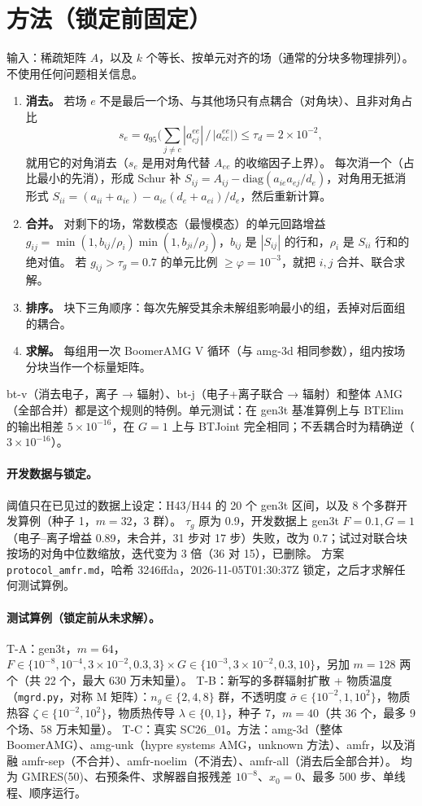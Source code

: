 \documentclass[11pt,a4paper]{ctexart}
\begin{document}
\section{方法（锁定前固定）}
输入：稀疏矩阵 $A$，以及 $k$ 个等长、按单元对齐的场（通常的分块多物理排列）。不使用任何问题相关信息。
\begin{enumerate}
\item \textbf{消去。} 若场 $e$ 不是最后一个场、与其他场只有点耦合（对角块）、且非对角占比
\[s_e=q_{95}\Big(\sum_{j\ne c}|a^{ee}_{cj}|\,/\,|a^{ee}_{cc}|\Big)\le\tau_d=2\times10^{-2},\]
就用它的对角消去（$s_e$ 是用对角代替 $A_{ee}$ 的收缩因子上界）。
每次消一个（占比最小的先消），形成 Schur 补 $S_{ij}=A_{ij}-\mathrm{diag}(a_{ie}a_{ej}/d_e)$，对角用无抵消形式
$S_{ii}=(a_{ii}+a_{ie})-a_{ie}(d_e+a_{ei})/d_e$，然后重新计算。
\item \textbf{合并。} 对剩下的场，常数模态（最慢模态）的单元回路增益
$g_{ij}=\min(1,b_{ij}/\rho_i)\min(1,b_{ji}/\rho_j)$，$b_{ij}$ 是 $|S_{ij}|$ 的行和，$\rho_i$ 是 $S_{ii}$ 行和的绝对值。
若 $g_{ij}>\tau_g=0.7$ 的单元比例 $\ge\varphi=10^{-3}$，就把 $i,j$ 合并、联合求解。
\item \textbf{排序。} 块下三角顺序：每次先解受其余未解组影响最小的组，丢掉对后面组的耦合。
\item \textbf{求解。} 每组用一次 BoomerAMG V 循环（与 amg-3d 相同参数），组内按场分块当作一个标量矩阵。
\end{enumerate}
bt-v（消去电子，离子 → 辐射）、bt-j（电子+离子联合 → 辐射）和整体 AMG（全部合并）都是这个规则的特例。单元测试：在 gen3t 基准算例上与 BTElim 的输出相差 $5\times10^{-16}$，在 $G=1$ 上与 BTJoint 完全相同；不丢耦合时为精确逆（$3\times10^{-16}$）。

\paragraph{开发数据与锁定。} 阈值只在已见过的数据上设定：H43/H44 的 20 个 gen3t 区间，以及 8 个多群开发算例（种子 1，$m=32$，3 群）。
$\tau_g$ 原为 0.9，开发数据上 gen3t $F=0.1,G=1$（电子--离子增益 0.89，未合并，31 步对 17 步）失败，改为 0.7；试过对联合块按场的对角中位数缩放，迭代变为 3 倍（36 对 15），已删除。
方案 \texttt{protocol\_amfr.md}，哈希 3246ffda，2026-11-05T01:30:37Z 锁定，之后才求解任何测试算例。

\paragraph{测试算例（锁定前从未求解）。}
T-A：gen3t，$m=64$，$F\in\{10^{-8},10^{-4},3\times10^{-2},0.3,3\}\times G\in\{10^{-3},3\times10^{-2},0.3,10\}$，另加 $m=128$ 两个（共 22 个，最大 630 万未知量）。
T-B：新写的多群辐射扩散 + 物质温度（\texttt{mgrd.py}，对称 M 矩阵）：$n_g\in\{2,4,8\}$ 群，不透明度 $\bar\sigma\in\{10^{-2},1,10^2\}$，物质热容 $\zeta\in\{10^{-2},10^2\}$，物质热传导 $\lambda\in\{0,1\}$，种子 7，$m=40$（共 36 个，最多 9 个场、58 万未知量）。
T-C：真实 SC26\_01。方法：amg-3d（整体 BoomerAMG）、amg-unk（hypre systems AMG，unknown 方法）、amfr，以及消融 amfr-sep（不合并）、amfr-noelim（不消去）、amfr-all（消去后全部合并）。
均为 GMRES(50)、右预条件、求解器自报残差 $10^{-8}$、$x_0=0$、最多 500 步、单线程、顺序运行。
\end{document}
